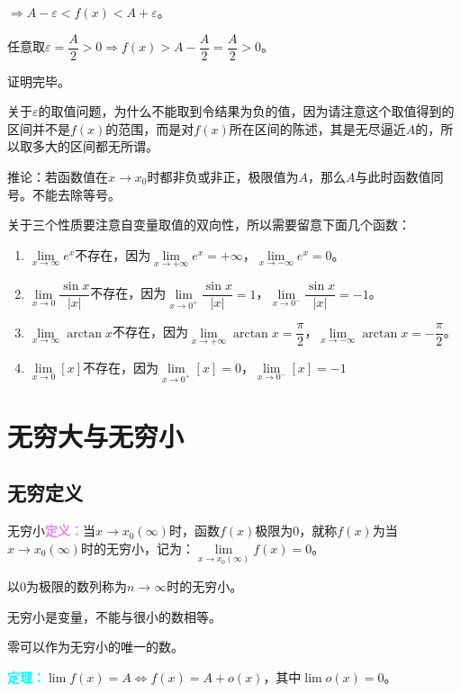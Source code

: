 \documentclass[UTF8, 12pt]{ctexart}
\begin{document}
$\Rightarrow A-\varepsilon<f(x)<A+\varepsilon$。

任意取$\varepsilon=\dfrac{A}{2}>0\Rightarrow f(x)>A-\dfrac{A}{2}=\dfrac{A}{2}>0$。

证明完毕。

关于$\varepsilon$的取值问题，为什么不能取到令结果为负的值，因为请注意这个取值得到的区间并不是$f(x)$的范围，而是对$f(x)$所在区间的陈述，其是无尽逼近$A$的，所以取多大的区间都无所谓。

推论：若函数值在$x\to x_0$时都非负或非正，极限值为$A$，那么$A$与此时函数值同号。不能去除等号。

\medskip

关于三个性质要注意自变量取值的双向性，所以需要留意下面几个函数：

\begin{enumerate}
    \item $\lim\limits_{x\to\infty}e^x$不存在，因为$\lim\limits_{x\to +\infty}e^x=+\infty$，$\lim\limits_{x\to -\infty}e^x=0$。
    \item $\lim\limits_{x\to 0}\dfrac{\sin x}{\vert x\vert}$不存在，因为$\lim\limits_{x\to 0^+}\dfrac{\sin x}{\vert x\vert}=1$，$\lim\limits_{x\to 0^-}\dfrac{\sin x}{\vert x\vert}=-1$。
    \item $\lim\limits_{x\to\infty}\arctan x$不存在，因为$\lim\limits_{x\to +\infty}\arctan x=\dfrac{\pi}{2}$，$\lim\limits_{x\to -\infty}\arctan x=-\dfrac{\pi}{2}$。
    \item $\lim\limits_{x\to 0}[x]$不存在，因为$\lim\limits_{x\to 0^+}[x]=0$，$\lim\limits_{x\to 0^-}[x]=-1$
\end{enumerate}

\section{无穷大与无穷小}

\subsection{无穷定义}

无穷小\textcolor{violet}{\textbf{定义：}}当$x\to x_0(\infty)$时，函数$f(x)$极限为0，就称$f(x)$为当$x\to x_0(\infty)$时的无穷小，记为：$\lim\limits_{x\to x_0(\infty)}f(x)=0$。

以0为极限的数列称为$n\to\infty$时的无穷小。

无穷小是变量，不能与很小的数相等。

零可以作为无穷小的唯一的数。

\textcolor{aqua}{\textbf{定理：}}$\lim f(x)=A\Leftrightarrow f(x)=A+o(x)$，其中$\lim o(x)=0$。
\end{document}
